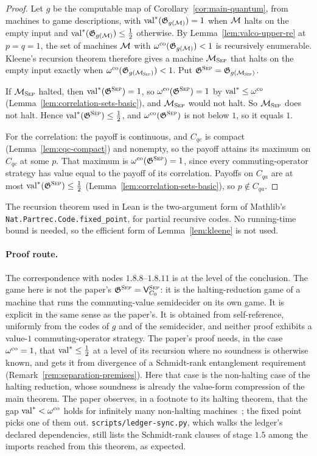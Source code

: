 \begin{proof}
\leanok
Let $g$ be the computable map of Corollary~\ref{cor:main-quantum}, from machines to game
descriptions, with $\mathrm{val}^*(\mathfrak{G}_{g(\mathcal{M})}) = 1$ when $\mathcal{M}$ halts on the empty
input and $\mathrm{val}^*(\mathfrak{G}_{g(\mathcal{M})}) \leq \frac12$ otherwise. By
Lemma~\ref{lem:valco-upper-re} at $p = q = 1$, the set of machines $\mathcal{M}$ with
$\omega^{\mathrm{co}}(\mathfrak{G}_{g(\mathcal{M})}) < 1$ is recursively enumerable. Kleene's recursion theorem
therefore gives a machine $\mathcal{M}_{\textsc{Sep}}$ that halts on the empty input exactly when
$\omega^{\mathrm{co}}(\mathfrak{G}_{g(\mathcal{M}_{\textsc{Sep}})}) < 1$. Put $\mathfrak{G}^{\textsc{Sep}} = \mathfrak{G}_{g(\mathcal{M}_{\textsc{Sep}})}$.

If $\mathcal{M}_{\textsc{Sep}}$ halted, then $\mathrm{val}^*(\mathfrak{G}^{\textsc{Sep}}) = 1$, so
$\omega^{\mathrm{co}}(\mathfrak{G}^{\textsc{Sep}}) = 1$ by $\mathrm{val}^* \leq \omega^{\mathrm{co}}$
(Lemma~\ref{lem:correlation-sets-basic}), and $\mathcal{M}_{\textsc{Sep}}$ would not halt. So
$\mathcal{M}_{\textsc{Sep}}$ does not halt. Hence $\mathrm{val}^*(\mathfrak{G}^{\textsc{Sep}}) \leq \frac12$, and
$\omega^{\mathrm{co}}(\mathfrak{G}^{\textsc{Sep}})$ is not below $1$, so it equals $1$.

For the correlation: the payoff is continuous, and $C_{qc}$ is compact
(Lemma~\ref{lem:cqc-compact}) and nonempty, so the payoff attains its maximum on $C_{qc}$ at
some $p$. That maximum is $\omega^{\mathrm{co}}(\mathfrak{G}^{\textsc{Sep}}) = 1$, since every commuting-operator
strategy has value equal to the payoff of its correlation. Payoffs on $C_{qa}$ are at most
$\mathrm{val}^*(\mathfrak{G}^{\textsc{Sep}}) \leq \frac12$ (Lemma~\ref{lem:correlation-sets-basic}), so
$p \notin C_{qa}$.
\end{proof}

The recursion theorem used in Lean is the two-argument form of Mathlib's
\texttt{Nat.Partrec.Code.fixed\_point}, for partial recursive codes. No running-time bound is
needed, so the efficient form of Lemma~\ref{lem:kleene} is not used.

\paragraph{Proof route.} The correspondence with nodes $1.8.8$--$1.8.11$ is at the level of the
conclusion. The game here is not the paper's $\mathfrak{G}^{\textsc{Sep}} = \mathsf{V}^{\textsc{Sep}}_{C_0}$: it is the
halting-reduction game of a machine that runs the commuting-value semidecider on its own
game. It is explicit in the same sense as the paper's. It is obtained from self-reference,
uniformly from the codes of $g$ and of the semidecider, and neither proof exhibits a
value-$1$ commuting-operator strategy. The paper's proof needs, in the case
$\omega^{\mathrm{co}} = 1$, that $\mathrm{val}^* \leq \frac12$ at a level of its recursion where no soundness is
otherwise known, and gets it from divergence of a Schmidt-rank entanglement requirement
(Remark~\ref{rem:separation-premises}). Here that case is the non-halting case of the
halting reduction, whose soundness is already the value-form compression of the main theorem.
The paper observes, in a footnote to its halting theorem, that the gap
$\mathrm{val}^* < \omega^{\mathrm{co}}$ holds for infinitely many non-halting machines~\cite{AuditSync26}; the
fixed point picks one of them out.
\texttt{scripts/ledger-sync.py}, which walks the ledger's declared dependencies, still lists
the Schmidt-rank clauses of stage $1.5$ among the imports reached from this theorem, as
expected.

